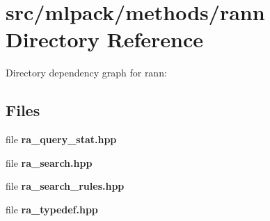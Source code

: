 \section{src/mlpack/methods/rann Directory Reference}
\label{dir_75384f8e5f4e51c47eff237c0d55ed40}
Directory dependency graph for rann\-:
\subsection*{Files}
\begin{DoxyCompactItemize}
\item 
file {\bf ra\-\_\-query\-\_\-stat.\-hpp}
\item 
file {\bf ra\-\_\-search.\-hpp}
\item 
file {\bf ra\-\_\-search\-\_\-rules.\-hpp}
\item 
file {\bf ra\-\_\-typedef.\-hpp}
\end{DoxyCompactItemize}
